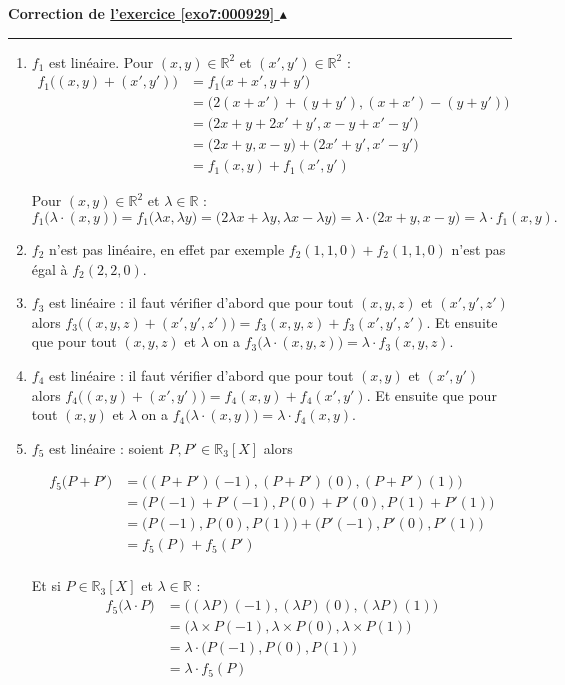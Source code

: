 \documentclass[11pt,a4paper]{article}
\newcommand{\Rr}{\mathbb{R}} \newcommand{\R}{\mathbb{R}}
\newcounter{exo}
\newcommand{\correction}[1]{\hypertarget{cor7:#1}{}\label{cor7:#1}{\bf Correction de \hyperlink{exo7:#1}{l'exercice \ref{exo7:#1} $\blacktriangle$}}\vspace{1mm}\hrule\vspace{1mm}}
\begin{document}
\correction{000929}
\begin{enumerate}
  \item $f_1$ est linéaire. Pour $(x,y) \in \Rr^2$ et $(x',y')\in \Rr^2$ :
\begin{align*}
f_1\big( (x,y)+(x',y') \big) 
  & = f_1\big( x+x',y+y' \big) \\
  & = \big(2(x+x')+ (y+y'), (x+x')-(y+y') \big) \\
  & = \big(2x+y +2x'+y', x-y+x'-y' \big) \\
  & = \big(2x+y,x-y \big) + \big(2x'+y',x'-y' \big) \\
  & = f_1(x,y)+f_1(x',y')
\end{align*}

Pour $(x,y)\in \Rr^2$ et $\lambda\in \Rr$ :
$$f_1\big( \lambda \cdot (x,y)\big) = f_1\big(\lambda x,\lambda y\big)
 = \big( 2\lambda x+\lambda y,\lambda x - \lambda y \big) = \lambda \cdot\big(2x+y,x-y \big) 
= \lambda \cdot f_1(x,y).$$

  \item $f_2$ n'est pas lin\'eaire, en effet par exemple $f_2(1,1,0)+f_2(1,1,0)$ n'est pas \'egal \`a $f_2(2,2,0)$.

  \item $f_3$ est linéaire : il faut vérifier d'abord que pour tout $(x,y,z)$ et $(x',y',z')$ alors
$f_3\big( (x,y,z) + (x',y',z') \big) = f_3(x,y,z)+f_3(x',y',z')$. Et ensuite que pour tout $(x,y,z)$ et $\lambda$
on a $f_3\big(\lambda\cdot(x,y,z) \big) = \lambda \cdot f_3(x,y,z)$.


  \item $f_4$ est linéaire : il faut vérifier d'abord que pour tout $(x,y)$ et $(x',y')$ alors
$f_4\big( (x,y) + (x',y') \big) = f_4(x,y)+f_4(x',y')$. Et ensuite que pour tout $(x,y)$ et $\lambda$
on a $f_4\big(\lambda\cdot(x,y) \big) = \lambda \cdot f_4(x,y)$.

  \item $f_5$ est lin\'eaire : soient $P,P' \in \Rr_3[X]$ alors 

\begin{align*}
f_5\big(P+P'\big) 
  & = \big( (P+P')(-1), (P+P')(0), (P+P')(1) \big) \\
  & = \big( P(-1)+P'(-1), P(0)+P'(0), P(1)+P'(1) \big) \\
  & = \big( P(-1), P(0), P(1) \big)  + \big( P'(-1), P'(0), P'(1) \big) \\
  & = f_5(P)+f_5(P')  \\
\end{align*}

Et si $P\in \Rr_3[X]$ et $\lambda \in \Rr$ :
\begin{align*}
f_5\big( \lambda \cdot P\big) 
  & =  \big( (\lambda P)(-1), (\lambda P)(0), (\lambda P)(1) \big) \\
  & = \big( \lambda \times P(-1), \lambda \times P(0), \lambda \times P(1) \big) \\
  & = \lambda \cdot \big( P(-1), P(0), P(1) \big) \\
  & = \lambda \cdot f_5(P) \\
\end{align*}
\end{enumerate}
\end{document}
